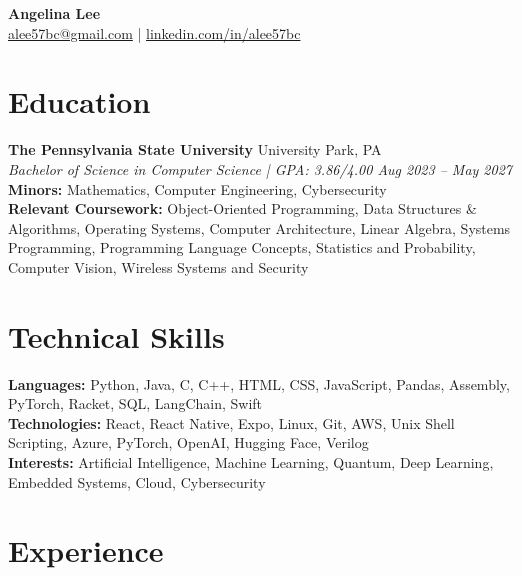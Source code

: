 \documentclass[letterpaper,11pt]{article}
\begin{document}
\begin{center}
    {\LARGE \textbf{Angelina Lee}} \\[3pt]
    \href{mailto:alee57bc@gmail.com}{alee57bc@gmail.com} |
    \href{https://www.linkedin.com/in/alee57bc/}{linkedin.com/in/alee57bc}
\end{center}

\section{Education}
\textbf{The Pennsylvania State University} \hfill University Park, PA \\
\footnotesize{\textit{Bachelor of Science in Computer Science | GPA: 3.86/4.00 \hfill Aug 2023 -- May 2027}} \\
\footnotesize{\textbf{Minors:} Mathematics, Computer Engineering, Cybersecurity} \\
\footnotesize{\textbf{Relevant Coursework:} Object-Oriented Programming, Data Structures \& Algorithms, Operating Systems, Computer Architecture, Linear Algebra, Systems Programming, Programming Language Concepts, Statistics and Probability, Computer Vision, Wireless Systems and Security}
\vspace{-7pt}

\section{Technical Skills}
\small{
\textbf{Languages:}  Python, Java, C, C++, HTML, CSS, JavaScript, Pandas, Assembly, PyTorch, Racket, SQL, LangChain, Swift \\
\textbf{Technologies:} React, React Native, Expo, Linux, Git, AWS, Unix Shell Scripting, Azure, PyTorch, OpenAI, Hugging Face, Verilog \\
\textbf{Interests:} Artificial Intelligence, Machine Learning, Quantum, Deep Learning, Embedded Systems, Cloud, Cybersecurity
}
\vspace{-7pt}

\section{Experience}
\end{document}

